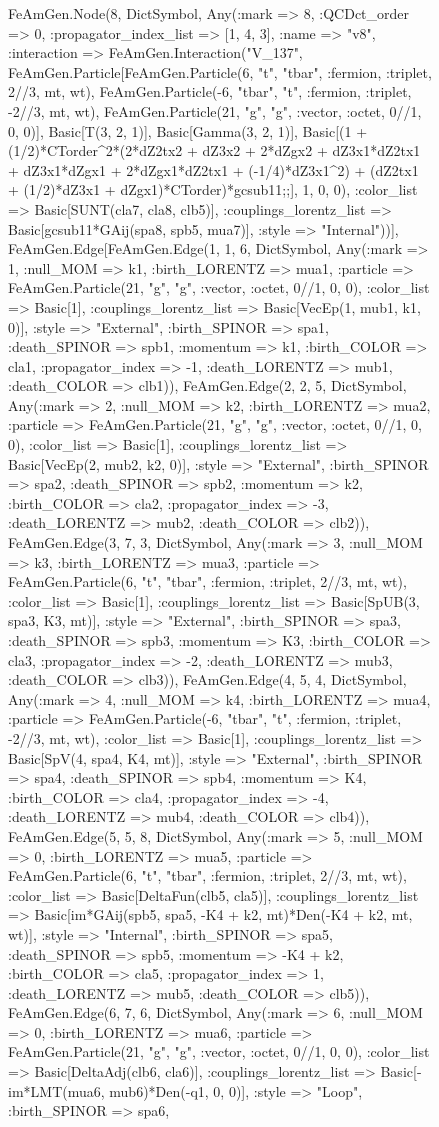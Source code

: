 \documentclass{revtex4}
\begin{document}
\begin{figure}[!htb]
\begin{center}
{FeAmGen.Node(8, Dict{Symbol, Any}(:mark => 8, :QCDct_order => 0, :propagator_index_list => [1, 4, 3], :name => "v8", :interaction => FeAmGen.Interaction("V_137", FeAmGen.Particle[FeAmGen.Particle(6, "t", "tbar", :fermion, :triplet, 2//3, mt, wt), FeAmGen.Particle(-6, "tbar", "t", :fermion, :triplet, -2//3, mt, wt), FeAmGen.Particle(21, "g", "g", :vector, :octet, 0//1, 0, 0)], Basic[T(3, 2, 1)], Basic[Gamma(3, 2, 1)], Basic[(1 + (1/2)*CTorder^2*(2*dZ2tx2 + dZ3x2 + 2*dZgx2 + dZ3x1*dZ2tx1 + dZ3x1*dZgx1 + 2*dZgx1*dZ2tx1 + (-1/4)*dZ3x1^2) + (dZ2tx1 + (1/2)*dZ3x1 + dZgx1)*CTorder)*gcsub11;;], 1, 0, 0), :color_list => Basic[SUNT(cla7, cla8, clb5)], :couplings_lorentz_list => Basic[gcsub11*GAij(spa8, spb5, mua7)], :style => "Internal"))], FeAmGen.Edge[FeAmGen.Edge(1, 1, 6, Dict{Symbol, Any}(:mark => 1, :null_MOM => k1, :birth_LORENTZ => mua1, :particle => FeAmGen.Particle(21, "g", "g", :vector, :octet, 0//1, 0, 0), :color_list => Basic[1], :couplings_lorentz_list => Basic[VecEp(1, mub1, k1, 0)], :style => "External", :birth_SPINOR => spa1, :death_SPINOR => spb1, :momentum => k1, :birth_COLOR => cla1, :propagator_index => -1, :death_LORENTZ => mub1, :death_COLOR => clb1)), FeAmGen.Edge(2, 2, 5, Dict{Symbol, Any}(:mark => 2, :null_MOM => k2, :birth_LORENTZ => mua2, :particle => FeAmGen.Particle(21, "g", "g", :vector, :octet, 0//1, 0, 0), :color_list => Basic[1], :couplings_lorentz_list => Basic[VecEp(2, mub2, k2, 0)], :style => "External", :birth_SPINOR => spa2, :death_SPINOR => spb2, :momentum => k2, :birth_COLOR => cla2, :propagator_index => -3, :death_LORENTZ => mub2, :death_COLOR => clb2)), FeAmGen.Edge(3, 7, 3, Dict{Symbol, Any}(:mark => 3, :null_MOM => k3, :birth_LORENTZ => mua3, :particle => FeAmGen.Particle(6, "t", "tbar", :fermion, :triplet, 2//3, mt, wt), :color_list => Basic[1], :couplings_lorentz_list => Basic[SpUB(3, spa3, K3, mt)], :style => "External", :birth_SPINOR => spa3, :death_SPINOR => spb3, :momentum => K3, :birth_COLOR => cla3, :propagator_index => -2, :death_LORENTZ => mub3, :death_COLOR => clb3)), FeAmGen.Edge(4, 5, 4, Dict{Symbol, Any}(:mark => 4, :null_MOM => k4, :birth_LORENTZ => mua4, :particle => FeAmGen.Particle(-6, "tbar", "t", :fermion, :triplet, -2//3, mt, wt), :color_list => Basic[1], :couplings_lorentz_list => Basic[SpV(4, spa4, K4, mt)], :style => "External", :birth_SPINOR => spa4, :death_SPINOR => spb4, :momentum => K4, :birth_COLOR => cla4, :propagator_index => -4, :death_LORENTZ => mub4, :death_COLOR => clb4)), FeAmGen.Edge(5, 5, 8, Dict{Symbol, Any}(:mark => 5, :null_MOM => 0, :birth_LORENTZ => mua5, :particle => FeAmGen.Particle(6, "t", "tbar", :fermion, :triplet, 2//3, mt, wt), :color_list => Basic[DeltaFun(clb5, cla5)], :couplings_lorentz_list => Basic[im*GAij(spb5, spa5, -K4 + k2, mt)*Den(-K4 + k2, mt, wt)], :style => "Internal", :birth_SPINOR => spa5, :death_SPINOR => spb5, :momentum => -K4 + k2, :birth_COLOR => cla5, :propagator_index => 1, :death_LORENTZ => mub5, :death_COLOR => clb5)), FeAmGen.Edge(6, 7, 6, Dict{Symbol, Any}(:mark => 6, :null_MOM => 0, :birth_LORENTZ => mua6, :particle => FeAmGen.Particle(21, "g", "g", :vector, :octet, 0//1, 0, 0), :color_list => Basic[DeltaAdj(clb6, cla6)], :couplings_lorentz_list => Basic[-im*LMT(mua6, mub6)*Den(-q1, 0, 0)], :style => "Loop", :birth_SPINOR => spa6, }
\end{center}
\end{figure}
\end{document}
